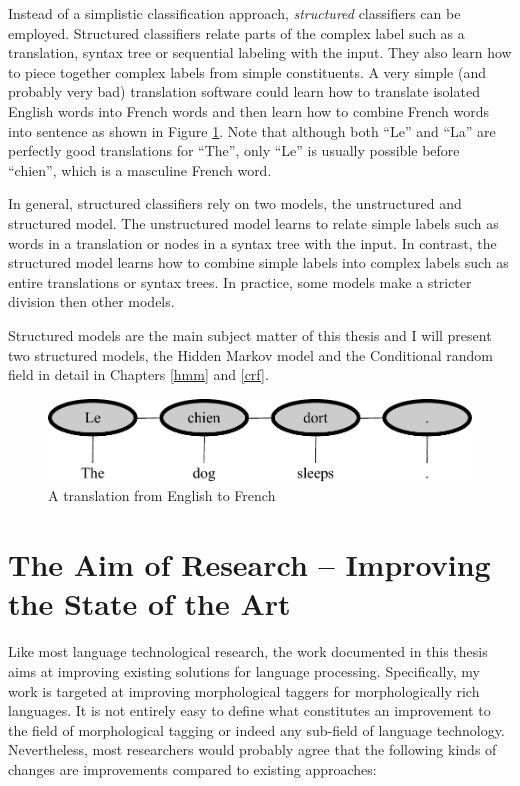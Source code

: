 Instead of a simplistic classification approach, {\it structured}
classifiers can be employed. Structured classifiers relate parts of
the complex label such as a translation, syntax tree or sequential
labeling with the input. They also learn how to piece together complex
labels from simple constituents. A very simple (and probably very bad)
translation software could learn how to translate isolated English
words into French words and then learn how to combine French words
into sentence as shown in Figure \ref{fr-tr}. Note that although both
``Le'' and ``La'' are perfectly good translations for ``The'', only
``Le'' is usually possible before ``chien'', which is a masculine
French word.

In general, structured classifiers rely on two models, the
unstructured and structured model. The unstructured model learns to
relate simple labels such as words in a translation or nodes in a
syntax tree with the input. In contrast, the structured model learns
how to combine simple labels into complex labels such as entire
translations or syntax trees. In practice, some models make a stricter
division then other models.

Structured models are the main subject matter of this thesis and I
will present two structured models, the Hidden Markov model and the
Conditional random field in detail in Chapters \ref{hmm} and
\ref{crf}.
 
\begin{figure}
\caption{A translation from English to French}\label{fr-tr}
\begin{center}
\includegraphics[scale=0.75]{chien}
\end{center}
\end{figure}

\section{The Aim of Research -- Improving the State of the Art}

Like most language technological research, the work documented in this
thesis aims at improving existing solutions for language
processing. Specifically, my work is targeted at improving
morphological taggers for morphologically rich languages. It is not
entirely easy to define what constitutes an improvement to the field
of morphological tagging or indeed any sub-field of language
technology. Nevertheless, most researchers would probably agree that
the following kinds of changes are improvements compared to existing
approaches:

